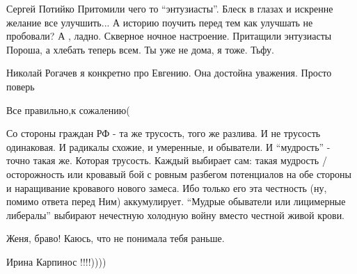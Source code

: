 \begin{itemize}

Сергей Потийко Притомили чего то \enquote{энтузиасты}. Блеск в глазах и искренне
желание все улучшить... А историю поучить перед тем как улучшать не пробовали?
А , ладно. Скверное ночное настроение. Притащили энтузиасты Пороша, а хлебать
теперь всем. Ты уже не дома, я тоже. Тьфу.


Николай Рогачев я конкретно про Евгению. Она достойна уважения. Просто поверь


Все правильно,к сожалению(


Со стороны граждан РФ - та же трусость, того же разлива. И не трусость
одинаковая. И радикалы схожие, и умеренные, и обыватели. И \enquote{мудрость} - точно
такая же. Которая трусость. Каждый выбирает сам: такая мудрость / осторожность
или кровавый бой с ровным разбегом потенциалов на обе стороны и наращивание
кровавого нового замеса. Ибо только его эта честность (ну, помимо ответа перед
Ним) аккумулирует. \enquote{Мудрые обыватели или лицимерные либералы} выбирают
нечестную холодную войну вместо честной живой крови.


Женя, браво! Каюсь, что не понимала тебя раньше.

Ирина Карпинос !!!!))))
\end{itemize}
